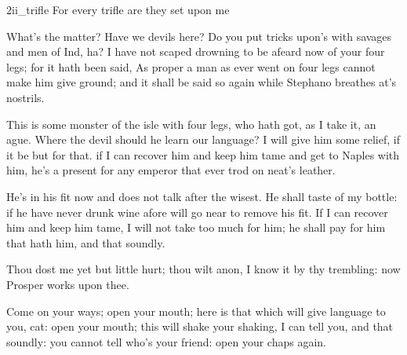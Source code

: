 


\begin{pictures} %
	\begin{a4}
		\begin{colorbigpic}
			[1]
			{2ii_trifle}
			{For every trifle are they set upon me}
		\end{colorbigpic}
	\end{a4}
\end{pictures}


	
\begin{prose_speech}[Stephano] What's the matter? Have we devils here? Do you put tricks upon's with savages and men of Ind, ha? I have not scaped drowning to be afeard now of your four legs; for it hath been said, As proper a man as ever went on four legs cannot make him give ground; and it shall be said so again while Stephano breathes at's nostrils.
\end{prose_speech}



\begin{prose_speech}[Stephano] 
This is some monster of the isle with four legs, who hath got, as I take it, an ague. Where the devil should he learn our language? I will give him some relief, if it be but for that. if I can recover him and keep him tame and get to Naples with him, he's a present for any emperor that ever trod on neat's leather.
\end{prose_speech}



\begin{prose_speech}[Stephano] 
He's in his fit now and does not talk after the wisest. He shall taste of my bottle: if he have never drunk wine afore will go near to remove his fit. If I can recover him and keep him tame, I will not take too much for him; he shall pay for him that hath him, and that soundly.
\end{prose_speech}

\begin{prose_speech}[Caliban] 
Thou dost me yet but little hurt; thou wilt anon, I know it by thy trembling: now Prosper works upon thee.
\end{prose_speech}

\begin{prose_speech}[Stephano] 
Come on your ways; open your mouth; here is that which will give language to you, cat: open your mouth; this will shake your shaking, I can tell you, and that soundly: you cannot tell who's your friend: open your chaps again.
\end{prose_speech}

